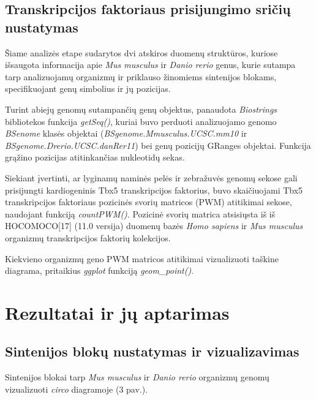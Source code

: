 \documentclass[12pt]{article}
\begin{document}
\subsection{Transkripcijos faktoriaus prisijungimo sričių nustatymas}
Šiame analizės etape sudarytos dvi atskiros duomenų struktūros, kuriose
išsaugota informacija apie \emph{Mus musculus} ir \emph{Danio rerio} genus,
kurie sutampa tarp analizuojamų organizmų ir priklauso žinomiems sintenijos
blokams, specifikuojant genų simbolius ir jų pozicijas.

Turint abiejų genomų sutampančių genų objektus, panaudota
\emph{Biostrings}\cite{BIOSTRINGS}
bibliotekos funkcija \emph{getSeq()}, kuriai buvo perduoti analizuojamo genomo
\emph{BSenome}\cite{BSGENOME} klasės objektai
(\emph{BSgenome.Mmusculus.UCSC.mm10} ir \emph{BSgenome.Drerio.UCSC.danRer11})
bei genų pozicijų GRanges objektai. Funkcija grąžino pozicijas atitinkančias
nukleotidų sekas.

Siekiant įvertinti, ar lyginamų naminės pelės ir zebražuvės genomų sekose gali
prisijungti kardiogeninis Tbx5 transkripcijos faktorius, buvo skaičiuojami Tbx5
transkripcijos faktoriaus pozicinės svorių matricos (PWM) atitikimai sekose,
naudojant funkciją \emph{countPWM()}. Pozicinė svorių matrica atsisiųsta iš
iš HOCOMOCO[17] (11.0 versija) duomenų bazės \emph{Homo sapiens} ir
\emph{Mus musculus} organizmų transkripcijos faktorių kolekcijos.

Kiekvieno organizmų geno PWM matricos atitikimai vizualizuoti taškine diagrama,
pritaikius \emph{ggplot} funkciją \emph{geom\_point()}.

\newpage


\section{Rezultatai ir jų aptarimas}
\subsection{Sintenijos blokų nustatymas ir vizualizavimas}

Sintenijos blokai tarp \emph{Mus musculus} ir \emph{Danio rerio} organizmų
genomų vizualizuoti \emph{circo} diagramoje (3 pav.).
\end{document}
